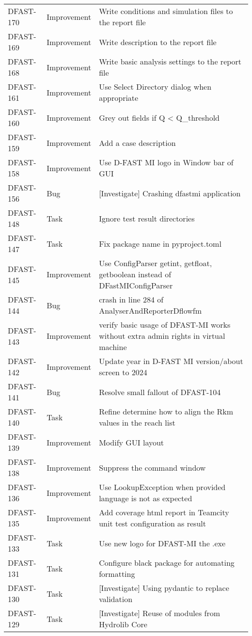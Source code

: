 \documentclass[git]{deltares_manual}
\begin{document}
\begin{longtable}{l|l|p{8cm}}
DFAST-170 & Improvement & Write conditions and simulation files to the report file \\
DFAST-169 & Improvement & Write description to the report file \\
DFAST-168 & Improvement & Write basic analysis settings to the report file \\
DFAST-161 & Improvement & Use Select Directory dialog when appropriate \\
DFAST-160 & Improvement & Grey out fields if Q < Q\_threshold \\
DFAST-159 & Improvement & Add a case description \\
DFAST-158 & Improvement & Use D-FAST MI logo in Window bar of GUI \\
DFAST-156 & Bug & [Investigate] Crashing dfastmi application \\
DFAST-148 & Task & Ignore test result directories \\
DFAST-147 & Task & Fix package name in pyproject.toml \\
DFAST-145 & Improvement & Use ConfigParser getint, getfloat, getboolean instead of DFastMIConfigParser \\
DFAST-144 & Bug & crash in line 284 of AnalyserAndReporterDflowfm \\
DFAST-143 & Improvement & verify basic usage of DFAST-MI works without extra admin rights in virtual machine \\
DFAST-142 & Improvement & Update year in D-FAST MI version/about screen to 2024 \\
DFAST-141 & Bug & Resolve small fallout of DFAST-104 \\
DFAST-140 & Task & Refine determine how to align the Rkm values in the reach list \\
DFAST-139 & Improvement & Modify GUI layout \\
DFAST-138 & Improvement & Suppress the command window \\
DFAST-136 & Improvement & Use LookupException when provided language is not as expected \\
DFAST-135 & Improvement & Add coverage html report in Teamcity unit test configuration as result \\
DFAST-133 & Task & Use new logo for DFAST-MI the .exe \\
DFAST-131 & Task & Configure black package for automating formatting \\
DFAST-130 & Task & [Investigate] Using pydantic to replace validation \\
DFAST-129 & Task & [Investigate] Reuse of modules from Hydrolib Core \\

\end{longtable}
\end{document}
